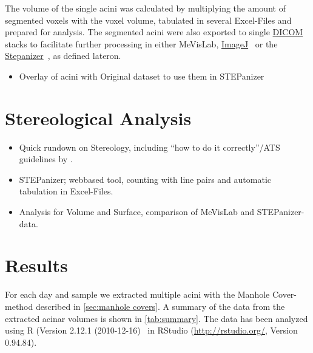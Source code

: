 \documentclass[%
	draft=true,
	paper=a4,%
	twoside=true,%
	abstract=true]{scrartcl}
\newcommand{\todome}[2][]{\todo[color=yellow!62!white, #1]{David: #2}}
\begin{document}
The volume of the single acini was calculated by multiplying the amount of segmented voxels with the voxel volume, tabulated in several Excel-Files and prepared for analysis. The segmented acini were also exported to single \href{https://secure.wikimedia.org/wikipedia/en/w/index.php?title=Digital_Imaging_and_Communications_in_Medicine&oldid=415023605}{DICOM} stacks to facilitate further processing in either MeVisLab, \href{http://rsbweb.nih.gov/ij/}{ImageJ}~\cite{Abramoff2004} or the \href{http://stepanizer.com/}{Stepanizer}~\cite{Tschanz2011}, as defined lateron.

\begin{itemize}
	\item Overlay of acini with Original dataset to use them in STEPanizer
\end{itemize}

\section{Stereological Analysis}
\begin{itemize}
	\item Quick rundown on Stereology, including “how to do it correctly”/ATS guidelines by \citet{Hsia2010}.
	\item STEPanizer; webbased tool, counting with line pairs and automatic tabulation in Excel-Files.
	\item Analysis for Volume and Surface, comparison of MeVisLab and STEPanizer-data.
\end{itemize}

\section{Results}\label{sec:Results}
For each day and sample we extracted multiple \todome{how many exactly?} acini with the Manhole Cover-method described in \autoref{sec:manhole covers}. A summary of the data from the extracted acinar volumes is shown in \autoref{tab:summary}. The data has been analyzed using R (Version 2.12.1 (2010-12-16)~\cite{R} in RStudio (\url{http://rstudio.org/}, Version 0.94.84). 

 
\end{document}
